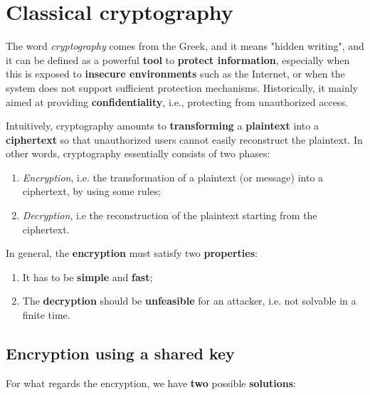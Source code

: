 \section{Classical cryptography}
The word \textit{cryptography} comes from the Greek, and it means "hidden writing", and it can be defined as a powerful \textbf{tool} to \textbf{protect information}, especially when this is exposed to \textbf{insecure environments} such as the Internet, or when the system does not support sufficient protection mechanisms. Historically, it mainly aimed at providing \textbf{confidentiality}, i.e., protecting from unauthorized access. 

Intuitively, cryptography amounts to \textbf{transforming} a \textbf{plaintext} into a \textbf{ciphertext} so that unauthorized users cannot easily reconstruct the plaintext. In other words, cryptography essentially consists of two phases:

\begin{enumerate}
    \item \textit{Encryption}, i.e. the transformation of a plaintext (or message) into a ciphertext, by using some rules;
    \item \textit{Decryption}, i.e the reconstruction of the plaintext starting from the ciphertext. 
\end{enumerate}

In general, the \textbf{encryption} must satisfy two \textbf{properties}:

\begin{enumerate}
    \item It has to be \textbf{simple} and \textbf{fast};
    \item The \textbf{decryption} should be \textbf{unfeasible} for an attacker, i.e. not solvable in a finite time.
\end{enumerate}

\subsection{Encryption using a shared key}

For what regards the encryption, we have \textbf{two} possible \textbf{solutions}:

